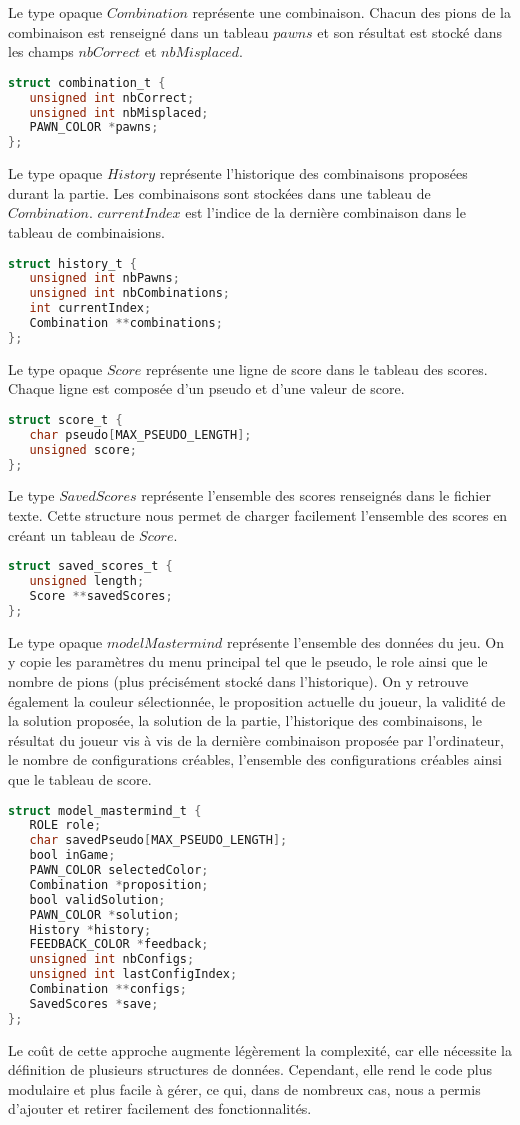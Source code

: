Le type opaque $Combination$ représente une combinaison. Chacun des pions de la combinaison est renseigné dans un tableau $pawns$ et son résultat est stocké dans les champs $nbCorrect$ et $nbMisplaced$.
\begin{lstlisting}[language=C]
struct combination_t {
   unsigned int nbCorrect;
   unsigned int nbMisplaced;
   PAWN_COLOR *pawns;
};
\end{lstlisting}

Le type opaque $History$ représente l'historique des combinaisons proposées durant la partie. Les combinaisons sont stockées dans une tableau de $Combination$. $currentIndex$ est l'indice de la dernière combinaison dans le tableau de combinaisions.
\begin{lstlisting}[language=C]
struct history_t {
   unsigned int nbPawns;
   unsigned int nbCombinations;
   int currentIndex;
   Combination **combinations;
};
\end{lstlisting}

Le type opaque $Score$ représente une ligne de score dans le tableau des scores. Chaque ligne est composée d'un pseudo et d'une valeur de score.
\begin{lstlisting}[language=C]
struct score_t {
   char pseudo[MAX_PSEUDO_LENGTH];
   unsigned score;
};
\end{lstlisting}

Le type $SavedScores$ représente l'ensemble des scores renseignés dans le fichier texte. Cette structure nous permet de charger facilement l'ensemble des scores en créant un tableau de $Score$.
\begin{lstlisting}[language=C]
struct saved_scores_t {
   unsigned length;
   Score **savedScores;
};
\end{lstlisting}

Le type opaque $modelMastermind$ représente l'ensemble des données du jeu. On y copie les paramètres du menu principal tel que le pseudo, le role ainsi que le nombre de pions (plus précisément stocké dans l'historique). On y retrouve également la couleur sélectionnée, le proposition actuelle du joueur, la validité de la solution proposée, la solution de la partie, l'historique des combinaisons, le résultat du joueur vis à vis de la dernière combinaison proposée par l'ordinateur, le nombre de configurations créables, l'ensemble des configurations créables ainsi que le tableau de score.
\begin{lstlisting}[language=C]
struct model_mastermind_t {
   ROLE role;
   char savedPseudo[MAX_PSEUDO_LENGTH];
   bool inGame;
   PAWN_COLOR selectedColor;
   Combination *proposition;
   bool validSolution;
   PAWN_COLOR *solution;
   History *history;
   FEEDBACK_COLOR *feedback;
   unsigned int nbConfigs;
   unsigned int lastConfigIndex;
   Combination **configs;
   SavedScores *save;
};
\end{lstlisting}
Le coût de cette approche augmente légèrement la complexité, car elle nécessite la définition de plusieurs structures de données. Cependant, elle rend le code plus modulaire et plus facile à gérer, ce qui, dans de nombreux cas, nous a permis d'ajouter et retirer facilement des fonctionnalités.

